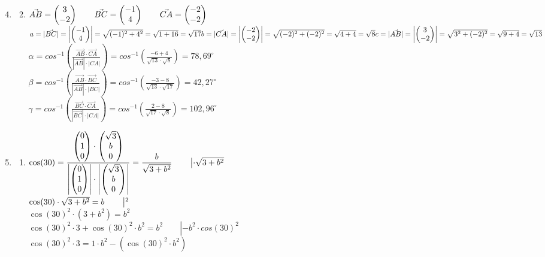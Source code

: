 		\begin{enumerate}
		\setcounter{enumi}{3}
			\item 
				\begin{enumerate}
					\setcounter{enumii}{1}
				\item	$\vec{AB}=\begin{pmatrix} 3 \\ -2 \end{pmatrix} \qquad \vec{BC}=\begin{pmatrix} -1 \\ 4 \end{pmatrix} \qquad \vec{CA}=\begin{pmatrix} -2 \\ -2 \end{pmatrix}$
\bigskip\newline
				$  a=|\vec{BC}| = \left|\begin{pmatrix} -1 \\ 4 \end{pmatrix}\right| = \sqrt{(-1)^2+4^2} = \sqrt{1+16} = \sqrt{17}\\ b=|\vec{CA}|=\left|\begin{pmatrix} -2 \\ -2 \end{pmatrix}\right| = \sqrt{(-2)^2+(-2)^2} = \sqrt{4+4}=\sqrt{8}\\ c=|\vec{AB}| = \left|\begin{pmatrix} 3 \\ -2 \end{pmatrix}\right| = \sqrt{3^2+(-2)^2} = \sqrt{9+4} =\sqrt{13}$\\
\bigskip\newline
				$ \alpha = cos^{-1} \left(\frac{\vec{AB} \cdot \vec{CA}}{|\vec{AB}|\cdot |CA|}\right) = cos^{-1} \left(\frac{-6+4}{\sqrt{13} \cdot \sqrt{8}}\right) = 78\mathrm{,} 69^\circ $\\
					$ \beta = cos^{-1} \left(\frac{\vec{AB}\cdot\vec{BC}}{|\vec{AB}|\cdot|BC|}\right)=cos^{-1} \left(\frac{-3-8}{\sqrt{13}\cdot\sqrt{17}}\right) =42,27^\circ$\\
				$ \gamma = cos^{-1} \left(\frac{\vec{BC}\cdot\vec{CA}}{|\vec{BC}|\cdot|CA|}\right)=cos^{-1} \left(\frac{2-8}{\sqrt{17}\cdot\sqrt{8}}\right) =102,96^\circ $
			\end{enumerate}
			
			\bigskip
			\item 	
					\begin{enumerate}									
				\item	$\cos(30) =\dfrac{\begin{pmatrix} 0 \\ 1 \\ 0 \end{pmatrix} \cdot \begin{pmatrix} \sqrt{3} \\ b \\ 0 \end{pmatrix}} {\left|\begin{pmatrix} 0 \\ 1 \\ 0 \end{pmatrix}\right| \cdot \left|\begin{pmatrix} \sqrt{3} \\ b \\ 0 \end{pmatrix}\right|} = \dfrac{b}{\sqrt{3+b^2}}      \qquad \left|\cdot \sqrt{3+b^2}\right.$\\
						
						$\cos(30) \cdot \sqrt{3+b^2} = b 							\qquad\left|^2\right.$ \\
						 
						$\cos(30)^2 \cdot (3+b^2) = b^2$\\
						 
						$\cos(30)^2 \cdot 3 + \cos(30)^2 \cdot b^2 = b^2      \qquad \left|-b^2\cdot cos(30)^2\right.$\\
						 
						$\cos(30)^2 \cdot 3 = 1 \cdot b^2 - (\cos(30)^2 \cdot b^2) $\\
						 

\end{enumerate}
\end{enumerate}
